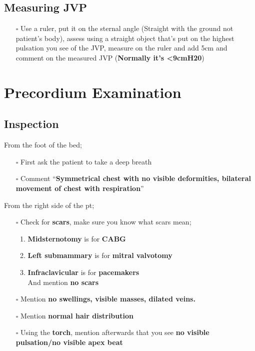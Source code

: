 \documentclass[
  13.5pt,
  a4paper,
  DIV=11,
  numbers=noendperiod]{scrreprt}
\providecommand{\tightlist}{%
  \setlength{\itemsep}{0pt}\setlength{\parskip}{0pt}}
\begin{document}
\subsection{Measuring JVP}\label{measuring-jvp}

\begin{itemize}
\tightlist
\item[$\square$]
  Use a ruler, put it on the sternal angle (Straight with the ground not
  patient's body), assess using a straight object that's put on the
  highest pulsation you see of the JVP, measure on the ruler and add 5cm
  and comment on the measured JVP (\textbf{Normally it's
  \textless9cmH20})
\end{itemize}

\section{Precordium Examination}\label{precordium-examination}

\subsection{Inspection}\label{inspection-1}

From the foot of the bed;

\begin{itemize}
\tightlist
\item[$\square$]
  First ask the patient to take a deep breath
\item[$\square$]
  Comment ``\textbf{Symmetrical chest with no visible deformities,
  bilateral movement of chest with respiration}''
\end{itemize}

From the right side of the pt;

\begin{itemize}
\tightlist
\item[$\square$]
  Check for \textbf{scars}, make sure you know what scars mean;

  \begin{enumerate}
  \def\labelenumi{\arabic{enumi}.}
  \tightlist
  \item
    \textbf{Midsternotomy} is for \textbf{CABG}\\
  \item
    \textbf{Left submammary} is for \textbf{mitral valvotomy}\\
  \item
    \textbf{Infraclavicular} is for \textbf{pacemakers}\\
    And mention \textbf{no scars}
  \end{enumerate}
\item[$\square$]
  Mention \textbf{no swellings, visible masses, dilated veins.}
\item[$\square$]
  Mention \textbf{normal hair distribution}
\item[$\square$]
  Using the \textbf{torch}, mention afterwards that you see \textbf{no
  visible pulsation/no visible apex beat}
\end{itemize}
\end{document}
